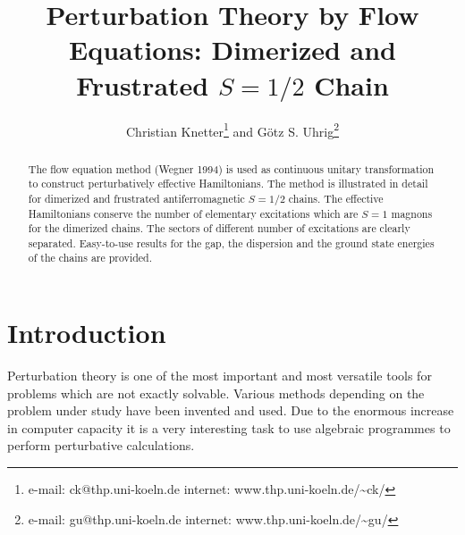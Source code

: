 \tighten


\setlength{\unitlength}{1cm}

\draft

\title{\bf Perturbation Theory by Flow Equations: 
Dimerized and Frustrated $S=1/2$ Chain}

\author{Christian Knetter\thanks{
e-mail: ck@thp.uni-koeln.de
\hspace*{\fill} {\protect\linebreak}
internet: www.thp.uni-koeln.de/\~{}ck/} and G\"otz S. 
Uhrig\thanks{e-mail: gu@thp.uni-koeln.de
\hspace*{\fill} {\protect\linebreak}
internet: www.thp.uni-koeln.de/\~{}gu/}}

\address{Institut f\"ur Theoretische Physik, Universit\"at zu
  K\"oln, Z\"ulpicher Str. 77, K\"oln 50937, Germany \\
  {\rm(\today)} }

\maketitle
\begin{abstract}
The flow equation method (Wegner 1994) is used as continuous
unitary transformation to construct perturbatively
effective Hamiltonians. The method is illustrated in detail
for dimerized and frustrated antiferromagnetic $S=1/2$ chains.
 The effective Hamiltonians
conserve the number of elementary excitations which are $S=1$ magnons for the
dimerized chains. The sectors of different
number of excitations are clearly separated.
Easy-to-use results for the gap, the dispersion and the ground 
state energies of the chains are provided.
\end{abstract}



\narrowtext
\section{Introduction}
Perturbation theory is one of the most important and most versatile
tools for problems which are not exactly solvable.
Various methods depending on the problem under study
have been invented and used. Due to the enormous increase
in computer capacity it is a very interesting task to
use algebraic programmes to perform perturbative
calculations.


